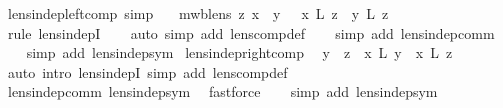 \begin{isabellebody}
\endisatagproof
{\isafoldproof}%
%
\isadelimproof
\isanewline
%
\endisadelimproof
\isanewline
{}\isamarkupfalse%
\ lens{\isacharunderscore}indep{\isacharunderscore}left{\isacharunderscore}comp\ {\isacharbrackleft}simp{\isacharbrackright}{\isacharcolon}\isanewline
\ \ {\isachardoublequoteopen}{\isasymlbrakk}\ mwb{\isacharunderscore}lens\ z{\isacharsemicolon}\ x\ {\isasymbowtie}\ y\ {\isasymrbrakk}\ {\isasymLongrightarrow}\ {\isacharparenleft}x\ {\isacharsemicolon}\isactrlsub L\ z{\isacharparenright}\ {\isasymbowtie}\ {\isacharparenleft}y\ {\isacharsemicolon}\isactrlsub L\ z{\isacharparenright}{\isachardoublequoteclose}\isanewline
%
\isadelimproof
\ \ %
\endisadelimproof
%
\isatagproof
{}\isamarkupfalse%
\ {\isacharparenleft}rule\ lens{\isacharunderscore}indepI{\isacharparenright}\isanewline
\ \ \isamarkupfalse%
\ {\isacharparenleft}auto\ simp\ add{\isacharcolon}\ lens{\isacharunderscore}comp{\isacharunderscore}def{\isacharparenright}\isanewline
\ \ \isamarkupfalse%
\ {\isacharparenleft}simp\ add{\isacharcolon}\ lens{\isacharunderscore}indep{\isacharunderscore}comm{\isacharparenright}\isanewline
\ \ \isamarkupfalse%
\ {\isacharparenleft}simp\ add{\isacharcolon}\ lens{\isacharunderscore}indep{\isacharunderscore}sym{\isacharparenright}\isanewline
{}\isamarkupfalse%
%
\endisatagproof
{\isafoldproof}%
%
\isadelimproof
\isanewline
%
\endisadelimproof
\isanewline
{}\isamarkupfalse%
\ lens{\isacharunderscore}indep{\isacharunderscore}right{\isacharunderscore}comp{\isacharcolon}\isanewline
\ \ {\isachardoublequoteopen}y\ {\isasymbowtie}\ z\ {\isasymLongrightarrow}\ {\isacharparenleft}x\ {\isacharsemicolon}\isactrlsub L\ y{\isacharparenright}\ {\isasymbowtie}\ {\isacharparenleft}x\ {\isacharsemicolon}\isactrlsub L\ z{\isacharparenright}{\isachardoublequoteclose}\isanewline
%
\isadelimproof
\ \ %
\endisadelimproof
%
\isatagproof
{}\isamarkupfalse%
\ {\isacharparenleft}auto\ intro{\isacharbang}{\isacharcolon}\ lens{\isacharunderscore}indepI\ simp\ add{\isacharcolon}\ lens{\isacharunderscore}comp{\isacharunderscore}def{\isacharparenright}\isanewline
\ \ \isamarkupfalse%
\ lens{\isacharunderscore}indep{\isacharunderscore}comm\ lens{\isacharunderscore}indep{\isacharunderscore}sym\ \isamarkupfalse%
\ fastforce\isanewline
\ \ \isamarkupfalse%
\ {\isacharparenleft}simp\ add{\isacharcolon}\ lens{\isacharunderscore}indep{\isacharunderscore}sym{\isacharparenright}\isanewline
{}\isamarkupfalse%

\end{isabellebody}
